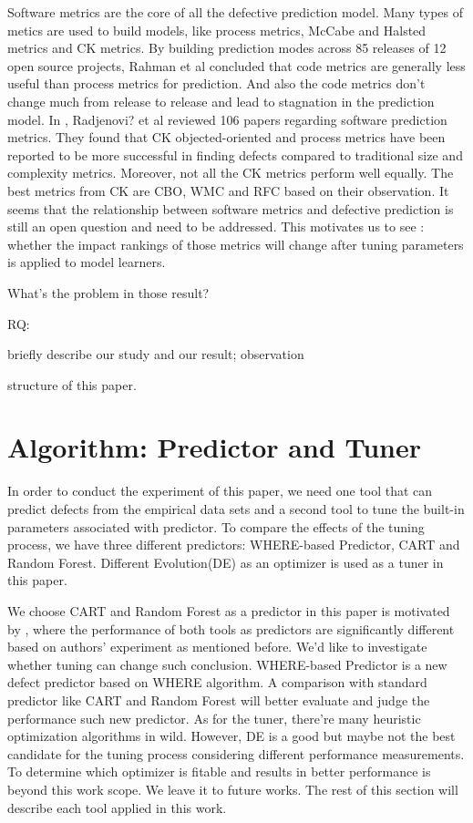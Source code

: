 \documentclass{sig-alternative}
\begin{document}
Software metrics are the core of all the defective prediction model. Many types of metics
are used to build models, like process metrics, McCabe and Halsted metrics  and CK metrics.
By building prediction modes across 85 releases of 12 open source projects, Rahman et al
\cite{rahman2013how}  concluded that code metrics are generally less useful than process
metrics for prediction. And also the code metrics don't change much from release to release
and lead to stagnation in the prediction model. In \cite{Radjenovi?20131397}, Radjenovi? et al
\cite{Radjenovi?20131397} reviewed 106 papers regarding software prediction metrics. They found
that CK objected-oriented and process metrics have been reported to be more successful in
finding defects compared to traditional size and complexity metrics. Moreover, not all the CK
metrics perform well equally. The best metrics from CK are CBO, WMC and RFC based on their 
observation. It seems that the relationship between software metrics and defective prediction is
still an open question and need to be addressed. This motivates us to see : whether the impact
rankings of those metrics will change after tuning parameters
is applied to model learners.



What's the problem in those result?

RQ:

briefly describe our study and  our result; observation

structure of this paper.


\section{Algorithm: Predictor and Tuner}

In order to conduct the experiment of this paper, we need one tool that can predict defects 
from the empirical data sets and a second tool to tune the built-in parameters associated with 
predictor. To compare the effects of the tuning process, we have three different predictors: 
WHERE-based Predictor, CART and Random Forest. Different Evolution(DE) as an optimizer 
is used as a tuner in this paper.

We choose CART and Random Forest as a predictor in this paper is motivated by 
\cite{lessmann2008benchmarking}, where the performance of both tools as predictors are 
significantly different based on authors' experiment as mentioned before. We'd like to 
investigate whether tuning can change such conclusion. WHERE-based Predictor is a new 
defect predictor based on WHERE\cite{menzies2013local} algorithm. A comparison with 
standard predictor like CART and Random Forest will better evaluate and judge the 
performance such new predictor. As for the tuner, there're many heuristic optimization 
algorithms in wild. However, DE is a good but maybe not the best candidate for the tuning 
process considering different performance measurements. To determine which optimizer is 
fitable and results in better performance is beyond this work scope. We leave it to future 
works. The rest of this section will describe each tool applied in this work.
\end{document}
